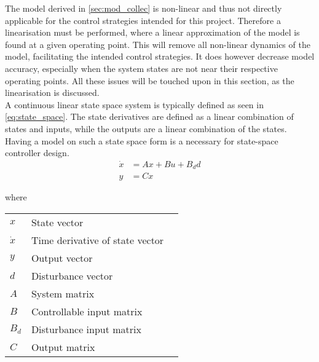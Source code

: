 







The model derived in \cref{sec:mod_collec} is non-linear and thus not directly applicable for the control strategies intended for this project. Therefore a linearisation must be performed, where a linear approximation of the model is found at a given operating point. This will remove all non-linear dynamics of the model, facilitating the intended control strategies. It does however decrease model accuracy, especially when the system states are not near their respective operating points. All these issues will be touched upon in this section, as the linearisation is discussed.\\

A continuous linear state space system is typically defined as seen in \cref{eq:state_space}. The state derivatives are defined as a linear combination of states and inputs, while the outputs are a linear combination of the states. Having a model on such a state space form is a necessary for state-space controller design.\\

\begin{equation} \label{eq:state_space}
	\begin{split}
		\dot{x} & = Ax + Bu + B_dd \\
		y 		& = Cx
	\end{split}
\end{equation}

where

\begin{center}
	\begin{tabular}{l p{8cm} l}
		$x$       & State vector                    &  \\
		$\dot{x}$ & Time derivative of state vector &  \\
		$y$       & Output vector                   &  \\
		$d$       & Disturbance vector              &  \\
		$A$       & System matrix                   &  \\
		$B$       & Controllable input matrix       &  \\
		$B_d$     & Disturbance input matrix        &  \\
		$C$       & Output matrix                   &
	\end{tabular}
\end{center}

